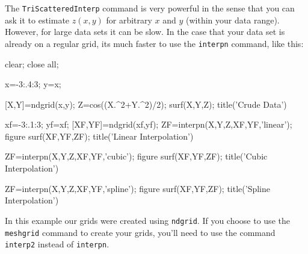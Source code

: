 The {\tt TriScatteredInterp} command is very powerful in the sense
that you can ask it to estimate $z(x,y)$ for arbitrary $x$ and $y$ (within
your data range).  However, for large data sets it can be slow.  In the
case that your data set is already on a regular grid, its much faster to
use the {\tt interpn} command, like this:
\begin{codeexample}
\begin{VerbatimOut}{\listingFile}
clear; close all;

x=-3:.4:3; y=x;

[X,Y]=ndgrid(x,y);
Z=cos((X.^2+Y.^2)/2);
surf(X,Y,Z);
title('Crude Data')


xf=-3:.1:3;
yf=xf;
[XF,YF]=ndgrid(xf,yf);
ZF=interpn(X,Y,Z,XF,YF,'linear');
figure
surf(XF,YF,ZF);
title('Linear Interpolation')


ZF=interpn(X,Y,Z,XF,YF,'cubic');
figure
surf(XF,YF,ZF);
title('Cubic Interpolation')


ZF=interpn(X,Y,Z,XF,YF,'spline');
figure
surf(XF,YF,ZF);
title('Spline Interpolation')
\end{VerbatimOut}
\end{codeexample}

In this example our grids were created using {\tt ndgrid}.  If you choose
to use the {\tt meshgrid} command to create your grids, you'll need
to use the command {\tt interp2} instead of {\tt interpn}.
